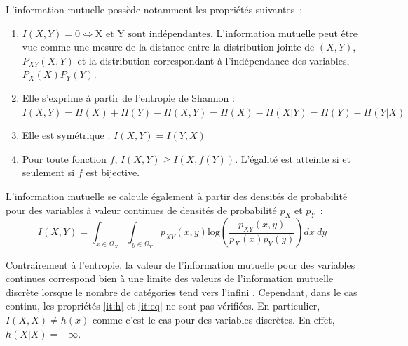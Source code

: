 \documentclass[../main]{subfiles}
\begin{document}
L'information mutuelle possède notamment les propriétés suivantes~:
\begin{enumerate}
\item $I(X,Y) = 0 \Leftrightarrow \textrm{X et Y sont indépendantes}$. L'information mutuelle peut être vue comme une mesure de la distance entre la distribution jointe de $(X,Y)$, $P_{XY}(X,Y)$ et la distribution correspondant à l'indépendance des variables, $P_X(X)P_Y(Y)$.
\item\label{it:h} Elle s'exprime à partir de l'entropie de Shannon : $I(X,Y) = H(X) + H(Y) - H(X,Y) = H(X) - H(X|Y) = H(Y) - H(Y|X)$
\item Elle est symétrique : $I(X,Y) = I(Y,X)$
\item\label{it:eq} Pour toute fonction $f$, $I(X,Y) \geq I(X,f(Y))$. L'égalité est atteinte si et seulement si $f$ est bijective.
\end{enumerate}

L'information mutuelle se calcule également à partir des densités de probabilité pour des variables à valeur continues de densités de probabilité $p_X$ et $p_Y$~:
\begin{equation}
    I(X,Y) = \int_{x \in \Omega_X}\int_{y \in \Omega_Y }{p_{XY}(x,y)\textrm{log}(\frac{p_{XY}(x,y)}{p_X(x)p_Y(y)})dx \: dy}
\end{equation}

Contrairement à l'entropie, la valeur de l'information mutuelle pour des variables continues correspond bien à une limite des valeurs de l'information mutuelle discrète lorsque le nombre de catégories tend vers l'infini \parencite{Cover2005ElementsOI}.
Cependant, dans le cas continu, les propriétés \ref{it:h} et \ref{it:eq} ne sont pas vérifiées. 
En particulier, $I(X,X) \neq h(x)$ comme c'est le cas pour des variables discrètes. En effet, $h(X|X) = - \infty$.
\end{document}

